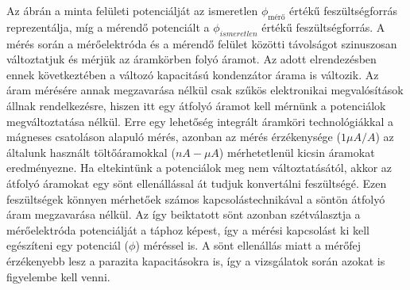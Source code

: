 
Az ábrán a minta felületi potenciálját az ismeretlen  $\phi_{\text{mérő}}$ értékű feszültségforrás reprezentálja, míg a mérendő potenciált a $\phi_{ismeretlen}$ értékű feszültségforrás. A mérés során a mérőelektróda és a mérendő felület közötti távolságot szinuszosan változtatjuk és mérjük az áramkörben folyó áramot. Az adott elrendezésben ennek következtében a változó kapacitású kondenzátor árama is változik. Az áram mérésére annak megzavarása nélkül csak szűkös elektronikai megvalósítások állnak rendelkezésre, hiszen itt egy átfolyó áramot kell mérnünk a potenciálok megváltoztatása nélkül. Erre egy lehetőség integrált áramköri technológiákkal a mágneses csatoláson alapuló mérés\cite{CMOS_I_measure}, azonban az mérés érzékenysége ($1\mu A/A$) az általunk használt töltőáramokkal ($nA-\mu A$) mérhetetlenül kicsin áramokat eredményezne. Ha eltekintünk a potenciálok meg nem változtatásától, akkor az átfolyó áramokat egy sönt ellenállással át tudjuk konvertálni feszültségé. Ezen feszültségek könnyen mérhetőek számos kapcsolástechnikával a söntön átfolyó áram megzavarása nélkül. Az így beiktatott sönt azonban szétválasztja a mérőelektróda potenciálját a táphoz képest, így a mérési kapcsolást ki kell egészíteni egy potenciál ($\phi$) méréssel is. A sönt ellenállás miatt a mérőfej érzékenyebb lesz a parazita kapacitásokra is, így a vizsgálatok során azokat is figyelembe kell venni.
